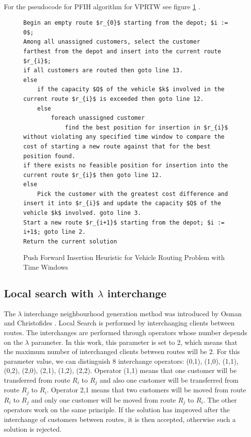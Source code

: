 \documentclass[a4paper,twoside,12pt]{book}
\begin{document}
\paragraph{}
For the pseudocode for PFIH algorithm for VPRTW see figure \ref{fig:PFIH} \cite{bib:chapter:PFIH}.
\begin{figure}
\centering
\begin{lstlisting}[mathescape=true]
Begin an empty route $r_{0}$ starting from the depot; $i := 0$;
Among all unassigned customers, select the customer farthest from the depot and insert into the current route $r_{i}$;
if all customers are routed then goto line 13.
else
    if the capacity $Q$ of the vehicle $k$ involved in the current route $r_{i}$ is exceeded then goto line 12.
	else
    	foreach unassigned customer
    		find the best position for insertion in $r_{i}$ without violating any specified time window to compare the cost of starting a new route against that for the best position found.   
if there exists no feasible position for insertion into the current route $r_{i}$ then goto line 12.
else
	Pick the customer with the greatest cost difference and insert it into $r_{i}$ and update the capacity $Q$ of the vehicle $k$ involved. goto line 3.
Start a new route $r_{i+1}$ starting from the depot; $i := i+1$; goto line 2.
Return the current solution
\end{lstlisting}
\caption{Push Forward Insertion Heuristic for Vehicle Routing Problem with Time Windows}
\label{fig:PFIH}
\end{figure}
\subsection{Local search with $\lambda$ interchange}
The $\lambda$ interchange neighbourhood generation method was introduced by Osman and Christofides \cite{bib:article:osman}. Local Search is performed by interchanging clients between routes. The interchanges are performed through operators whose number depends on the $\lambda$ parameter. In this work, this parameter is set to 2, which means that the maximum number of interchanged clients between routes will be 2. For this parameter value, we can distinguish 8 interchange operators: (0,1), (1,0), (1,1), (0,2), (2,0), (2,1), (1,2), (2,2). Operator (1,1) means that one customer will be transferred from route $R_{i}$ to $R_{j}$ and also one customer will be transferred from route $R_{j}$ to $R_{i}$. Operator 2,1 means that two customers will be moved from route $R_{i}$ to $R_{j}$ and only one customer will be moved from route $R_{j}$ to $R_{i}$. The other operators work on the same principle. If the solution has improved after the interchange of customers between routes, it is then accepted, otherwise such a solution is rejected. \cite{bib:article:LocalSearchLambda} 
\end{document}
